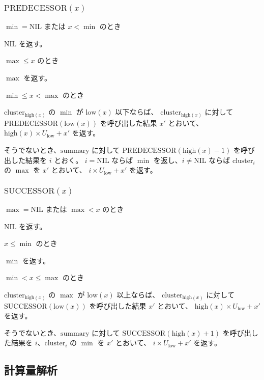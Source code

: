 \documentclass[dvipdfmx,a4j,10pt]{jarticle}
\begin{document}
\subsubsection{$\mathrm{PREDECESSOR}(x)$}

\noindent [1] $\min = \mathrm{NIL}$ または $x < \min$ のとき

$\mathrm{NIL}$ を返す。

\noindent [2] $\max \leq x$ のとき

$\max$ を返す。

\noindent [3] $\min \leq x < \max$ のとき

$\mathrm{cluster}_{\mathrm{high}(x)}$ の $\min$ が $\mathrm{low}(x)$ 以下ならば、
$\mathrm{cluster}_{\mathrm{high}(x)}$ に対して $\mathrm{PREDECESSOR}(\mathrm{low}(x))$ を呼び出した結果 $x'$ とおいて、
$\mathrm{high}(x) \times U_{\mathrm{low}} + x'$ を返す。

そうでないとき、$\mathrm{summary}$ に対して $\mathrm{PREDECESSOR}(\mathrm{high}(x) - 1)$ を呼び出した結果を $i$ とおく。
$i = \mathrm{NIL}$ ならば $\min$ を返し、$i \neq \mathrm{NIL}$ ならば $\mathrm{cluster}_i$ の $\max$ を $x'$ とおいて、
$i \times U_{\mathrm{low}} + x'$ を返す。

\subsubsection{$\mathrm{SUCCESSOR}(x)$}

\noindent [1] $\max = \mathrm{NIL}$ または $\max < x$ のとき

$\mathrm{NIL}$ を返す。

\noindent [2] $x \leq \min$ のとき

$\min$ を返す。

\noindent [3] $\min < x \leq \max$ のとき

$\mathrm{cluster}_{\mathrm{high}(x)}$ の $\max$ が $\mathrm{low}(x)$ 以上ならば、
$\mathrm{cluster}_{\mathrm{high}(x)}$ に対して $\mathrm{SUCCESSOR}(\mathrm{low}(x))$ を呼び出した結果 $x'$ とおいて、
$\mathrm{high}(x) \times U_{\mathrm{low}} + x'$ を返す。

そうでないとき、$\mathrm{summary}$ に対して $\mathrm{SUCCESSOR}(\mathrm{high}(x) + 1)$ を呼び出した結果を $i$、$\mathrm{cluster}_i$ の $\min$ を $x'$ とおいて、
$i \times U_{\mathrm{low}} + x'$ を返す。

\subsection{計算量解析}
\end{document}
